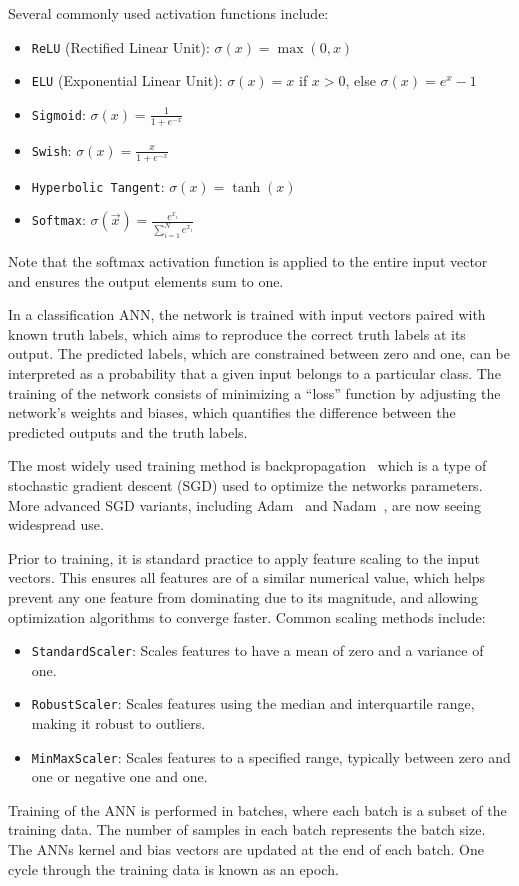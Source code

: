 Several commonly used activation functions include:
\begin{itemize}
  \item \texttt{ReLU} (Rectified Linear Unit): $\sigma(x) = \max(0, x)$
  \item \texttt{ELU} (Exponential Linear Unit): $\sigma(x) = x$ if $x > 0$, else $\sigma(x) = e^{x} - 1$
  \item \texttt{Sigmoid}: $\sigma(x) = \frac{1}{1 + e^{-x}}$
  \item \texttt{Swish}: $\sigma(x) = \frac{x}{1 + e^{-x}}$
  \item \texttt{Hyperbolic Tangent}: $\sigma(x) = \tanh(x)$
  \item \texttt{Softmax}: $\sigma(\vec{x})= \frac{e^{x_{i}}}{\sum_{i=1}^{N}e^{x_{i}}}$
\end{itemize}
Note that the softmax activation function is applied to the entire input vector and ensures the output elements sum to one.

In a classification ANN, the network is trained with input vectors paired with known truth labels, which aims to reproduce the correct truth labels at its output. The predicted labels, which are constrained between zero and one, can be interpreted as a probability that a given input belongs to a particular class. The training of the network consists of minimizing a ``loss'' function by adjusting the network's weights and biases, which quantifies the difference between the predicted outputs and the truth labels. 

The most widely used training method is backpropagation~\cite{backpropagation} which is a type of stochastic gradient descent (SGD) used to optimize the networks parameters. More advanced SGD variants, including Adam~\cite{kingma2017adammethodstochasticoptimization} and Nadam~\cite{dozat2016}, are now seeing widespread use.

Prior to training, it is standard practice to apply feature scaling to the input vectors. This ensures all features are of a similar numerical value, which helps prevent any one feature from dominating due to its magnitude, and allowing optimization algorithms to converge faster. Common scaling methods include: 
\begin{itemize}
  \item \texttt{StandardScaler}: Scales features to have a mean of zero and a variance of one.
  \item \texttt{RobustScaler}: Scales features using the median and interquartile range, making it robust to outliers.
  \item \texttt{MinMaxScaler}: Scales features to a specified range, typically between zero and one or negative one and one.
\end{itemize}
Training of the ANN is performed in batches, where each batch is a subset of the training data. The number of samples in each batch represents the batch size. The ANNs kernel and bias vectors are updated at the end of each batch. One cycle through the training data is known as an epoch. 

